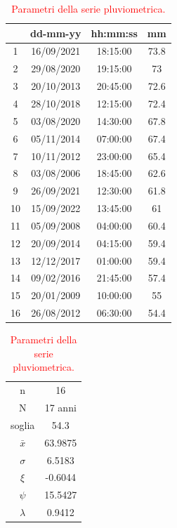 \begin{table}[H]
    \caption*{Evento pluviometrico di 180 minuti.}
    \begin{minipage}{.5\linewidth}
      \caption{\textcolor{red}{Campione della serie pluviometrica.}}
      \centering
        \begin{tabular}{cccc}
            \toprule
            & dd-mm-yy   & hh:mm:ss & mm \\
         \midrule
         1  & 16/09/2021 & 18:15:00 & 73.8 \\
         2  & 29/08/2020 & 19:15:00 & 73   \\
         3  & 20/10/2013 & 20:45:00 & 72.6 \\
         4  & 28/10/2018 & 12:15:00 & 72.4 \\
         5  & 03/08/2020 & 14:30:00 & 67.8 \\
         6  & 05/11/2014 & 07:00:00 & 67.4 \\
         7  & 10/11/2012 & 23:00:00 & 65.4 \\
         8  & 03/08/2006 & 18:45:00 & 62.6 \\
         9  & 26/09/2021 & 12:30:00 & 61.8 \\
         10 & 15/09/2022 & 13:45:00 & 61   \\
         11 & 05/09/2008 & 04:00:00 & 60.4 \\
         12 & 20/09/2014 & 04:15:00 & 59.4 \\
         13 & 12/12/2017 & 01:00:00 & 59.4 \\
         14 & 09/02/2016 & 21:45:00 & 57.4 \\
         15 & 20/01/2009 & 10:00:00 & 55   \\
         16 & 26/08/2012 & 06:30:00 & 54.4 \\
         \bottomrule
        \end{tabular}
    \end{minipage}%
    \begin{minipage}{.5\linewidth}
      \centering
        \caption{\textcolor{red}{Parametri della serie pluviometrica.}}
        \begin{tabular}{cc}
            \toprule
            n        &    16     \\
            N        & 17 anni \\
            soglia   &     54.3    \\
            $\bar{x}$ &  63.9875\\
            $\sigma$ &   6.5183  \\
            $\xi$    &    -0.6044  \\
            $\psi$      &    15.5427 \\
            $\lambda$   &    0.9412\\
        \bottomrule     
        \end{tabular}
    \end{minipage} 
\end{table}

